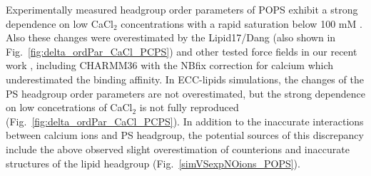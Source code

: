 \documentclass[journal=jpcbfk,manuscript=article]{achemso}
\begin{document}
Experimentally measured headgroup order parameters of POPS exhibit a strong dependence
on low CaCl$_2$ concentrations with a rapid saturation below 100 mM \cite{roux90}.
Also these changes were overestimated by the Lipid17/Dang (also shown in Fig.~\ref{fig:delta_ordPar_CaCl_PCPS})
and other tested force fields in our recent work \cite{NMRlipidsIV}, including CHARMM36 with the NBfix correction for calcium
which underestimated the binding affinity.
In ECC-lipids simulations, the changes of the PS headgroup order parameters are not overestimated,
but the strong dependence on low concetrations of CaCl$_2$ is not fully reproduced (Fig.~\ref{fig:delta_ordPar_CaCl_PCPS}).
In addition to the inaccurate interactions between calcium ions and PS headgroup, the potential sources of this
discrepancy include the above observed slight overestimation of  counterions and
inaccurate structures of the lipid headgroup (Fig.~\ref{simVSexpNOions_POPS}).
\end{document}
